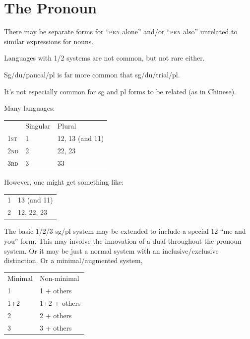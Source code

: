 \documentclass[11pt]{article}
\newcommand{\I}[1]{\textsc{#1}}   %
\begin{document}

\section{The Pronoun}
There may be separate forms for ``\I{prn} alone'' and/or ``\I{prn}
also'' unrelated to similar expressions for nouns.

Languages with 1/2 systems are not common, but not rare either.

Sg/du/paucal/pl is far more common that sg/du/trial/pl.

It's not especially common for sg and pl forms to be related (as in
Chinese).

Many languages:

\begin{center}
\begin{tabular}{lll}
  & Singular & Plural \\
\I{1st} & 1 & 12, 13 (and 11) \\
\I{2nd} & 2 & 22, 23 \\
\I{3rd} & 3 & 33
\end{tabular}
\end{center}

However, one might get something like:

\begin{center}
\begin{tabular}{ll}
1 & 13 (and 11) \\
2 & 12, 22, 23     
\end{tabular}
\end{center}

The basic 1/2/3 sg/pl system may be extended to include a special 12
``me and you'' form.  This may involve the innovation of a dual
throughout the pronoun system.  Or it may be just a normal system with
an inclusive/exclusive distinction.  Or a minimal/augmented system, 

\begin{center}
\begin{tabular}{ll}
Minimal & Non-minimal \\
1  & 1 + others \\
1+2 & 1+2 + others \\
2 & 2 + others \\
3 & 3 + others 
\end{tabular}
\end{center}
\end{document}
